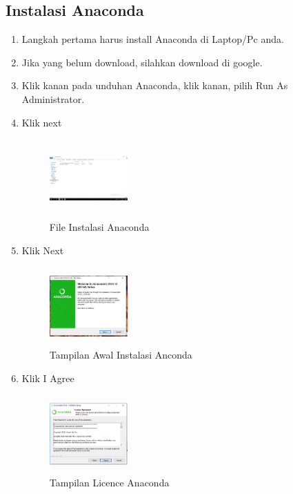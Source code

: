 \subsection{Instalasi Anaconda}
\begin{enumerate}
    \item Langkah pertama harus install Anaconda di Laptop/Pc anda.
    \item Jika yang belum download, silahkan download di google.
    \item Klik kanan pada unduhan Anaconda, klik kanan, pilih Run As Administrator.
    \item Klik next
    \begin{figure}[!htbp]
        \centering
        \includegraphics[width=3cm,height=3cm]{figures/gb1.png}
        \caption{File Instalasi Anaconda}
        \label{File}
        \end{figure}

    \item Klik Next
    \begin{figure}[!htbp]
        \centering
        \includegraphics[width=3cm,height=3cm]{figures/gb2.png}
        \caption{Tampilan Awal Instalasi Anconda}
        \label{Awal}
        \end{figure}

    \item Klik I Agree
    \begin{figure}[!htbp]
        \centering
        \includegraphics[width=3cm,height=3cm]{figures/gb3.png}
        \caption{Tampilan Licence Anaconda}
        \label{Licence}
        \end{figure}


\end{enumerate}
